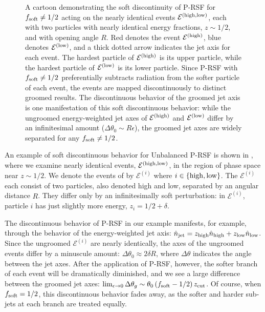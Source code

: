 \begin{figure}[t!]
{
}
\caption{
A cartoon demonstrating the soft discontinuity of P-RSF for \(f_{\rm soft} \neq 1/2\) acting on the nearly identical events \(\mathcal E^{(\rm high, low)}\), each with two particles with nearly identical energy fractions, \(z \sim 1/2\), and with opening angle \(R\).
%
Red denotes the event \(\mathcal E^{(\rm high)}\), blue denotes \(\mathcal E^{(\rm low)}\), and a thick dotted arrow indicates the jet axis for each event.
%
The hardest particle of \(\mathcal E^{(\rm high)}\) is its upper particle, while the hardest particle of \(\mathcal E^{(\rm low)}\) is its lower particle.
%
Since P-RSF with \(f_{\rm soft} \neq 1/2\) preferentially subtracts radiation from the softer particle of each event, the events are mapped discontinuously to distinct groomed results.
%
The discontinuous behavior of the groomed jet axis is one manifestation of this soft discontinuous behavior:
%
while the ungroomed energy-weighted jet axes of \(\mathcal E^{(\rm high)}\) and \(\mathcal E^{(\rm low)}\) differ by an infinitesimal amount (\(\Delta\theta_0 \sim R \epsilon\)), the groomed jet axes are widely separated for any \(f_{\rm soft} \neq 1/2\).
}
\label{fig:rsf_discont}
\end{figure}

An example of soft discontinuous behavior for Unbalanced P-RSF is shown in , where we examine nearly identical events, \(\mathcal{E}^{(\rm high, low)}\), in the region of phase space near \(z \sim 1/2\).
%
We denote the events of  by \(\mathcal{E}^{(i)}\) where \(i \in \{{\rm high, low}\}\).
%
The \(\mathcal E^{(i)}\) each consist of two particles, also denoted high and low, separated by an angular distance \(R\).
%
They differ only by an infinitesimally soft perturbation:
%
in \(\mathcal{E}^{(i)}\), particle \(i\) has just slightly more energy, \(z_i = 1/2 + \delta\).

The discontinuous behavior of P-RSF in our example manifests, for example, through the behavior of the energy-weighted jet axis:
%
\(\hat n_{\rm jet} = z_{\rm high} \hat n_{\rm high} +  z_{\rm low} \hat n_{\rm low}\).
%
Since the ungroomed \(\mathcal{E}^{(i)}\) are nearly identically, the axes of the ungroomed events differ by a minuscule amount:
%
\(\Delta\theta_{0} \approx 2\delta R\), where \(\Delta \theta\) indicates the angle between the jet axes.
%
After the application of P-RSF, however, the softer branch of each event will be dramatically diminished, and we see a large difference between the groomed jet axes:
%
\(\lim_{\epsilon\to 0}\Delta \theta_{g} \sim \theta_0\,(f_{\rm soft} - 1/2)\,z_{\rm cut}\).
%
Of course, when \(f_{\rm soft} = 1/2\), this discontinuous behavior fades away, as the softer and harder sub-jets at each branch are treated equally.

